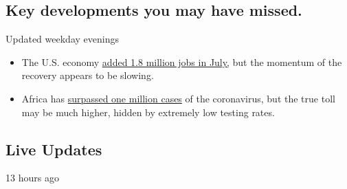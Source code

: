 \hypertarget{key-developments-you-may-have-missed}{%
\subsection{Key developments you may have
missed.}\label{key-developments-you-may-have-missed}}

Updated weekday evenings

\begin{itemize}
\tightlist
\item
  The U.S. economy
  \href{https://www.nytimes.com/live/2020/08/07/business/stock-market-today-coronavirus}{added
  1.8 million jobs in July,} but the momentum of the recovery appears to
  be slowing.
\item
  Africa has
  \href{https://www.nytimes.com/2020/08/07/world/covid-19-news.html\#link-16eac8b3}{surpassed
  one million cases} of the coronavirus, but the true toll may be much
  higher, hidden by extremely low testing rates.
\end{itemize}

\hypertarget{live-updates}{%
\subsection{Live Updates}\label{live-updates}}

13 hours ago

